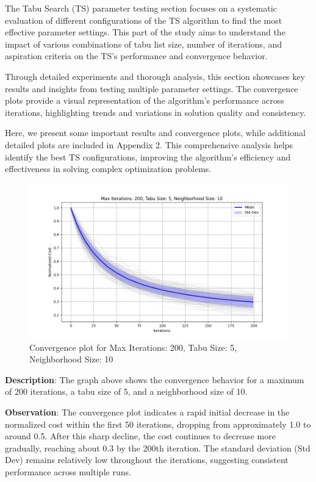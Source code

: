 \documentclass[
]{article}
\begin{document}
    The Tabu Search (TS) parameter testing section focuses on a systematic evaluation of different configurations of the TS algorithm to find the most effective parameter settings. This part of the study aims to understand the impact of various combinations of tabu list size, number of iterations, and aspiration criteria on the TS's performance and convergence behavior.

    Through detailed experiments and thorough analysis, this section showcases key results and insights from testing multiple parameter settings. The convergence plots provide a visual representation of the algorithm’s performance across iterations, highlighting trends and variations in solution quality and consistency.

    Here, we present some important results and convergence plots, while additional detailed plots are included in Appendix 2. This comprehensive analysis helps identify the best TS configurations, improving the algorithm’s efficiency and effectiveness in solving complex optimization problems.

    \begin{figure}[H]
        \centering
        \includegraphics[width=\textwidth]{tabu_search/max_iter_200_tabu_size_5_neighborhood_size_10}
        \caption{Convergence plot for Max Iterations: 200, Tabu Size: 5, Neighborhood Size: 10}
        \label{fig:ts_200_5_10}
    \end{figure}

    \textbf{Description}: The graph above shows the convergence behavior for a maximum of 200 iterations, a tabu size of 5, and a neighborhood size of 10.

    \textbf{Observation}: The convergence plot indicates a rapid initial decrease in the normalized cost within the first 50 iterations, dropping from approximately 1.0 to around 0.5. After this sharp decline, the cost continues to decrease more gradually, reaching about 0.3 by the 200th iteration. The standard deviation (Std Dev) remains relatively low throughout the iterations, suggesting consistent performance across multiple runs.
\end{document}
